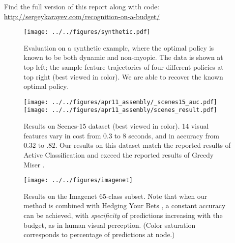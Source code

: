 Find the full version of this report along with code:
{\footnotesize \url{http://sergeykarayev.com/recognition-on-a-budget/}}

\begin{figure}[ht]
\centering
\texttt{[image: ../../figures/synthetic.pdf]}
\vspace{-2em}
\caption{
Evaluation on a synthetic example, where the optimal policy is known to be both dynamic and non-myopic.
The data is shown at top left; the sample feature trajectories of four different policies at top right (best viewed in color).
We are able to recover the known optimal policy.
}

\texttt{[image: ../../figures/apr11\_assembly/\_scenes15\_auc.pdf]}
\texttt{[image: ../../figures/apr11\_assembly/scenes\_result.pdf]}
\caption{
Results on Scenes-15 dataset (best viewed in color).
14 visual features vary in cost from 0.3 to 8 seconds, and in accuracy from 0.32 to .82.
Our results on this dataset match the reported results of Active Classification \cite{Gao-NIPS-2011} and exceed the reported results of Greedy Miser \cite{Xu-ICML-2012}.
\label{fig:scenes}
}

\texttt{[image: ../../figures/imagenet]}
\vspace{-1em}
\caption{
Results on the Imagenet 65-class subset. Note that when our method is combined with Hedging Your Bets \cite{Deng-CVPR-2012}, a constant accuracy can be achieved, with \emph{specificity} of predictions increasing with the budget, as in human visual perception.
(Color saturation corresponds to percentage of predictions at node.)
\label{fig:imagenet}}
\end{figure}




